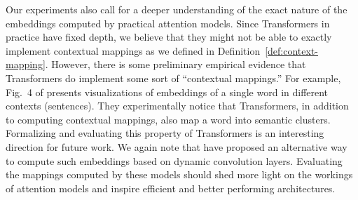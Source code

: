 
Our experiments also call for a deeper understanding of the exact nature of the embeddings computed by practical attention models.
Since Transformers in practice have fixed depth, we believe that they might not be able to exactly implement contextual mappings as we defined in Definition~\ref{def:context-mapping}. 
However, there is some preliminary empirical evidence that Transformers do implement some sort of ``contextual mappings.'' For example,
Fig.~4 of \citet{coenen2019visualizing} presents visualizations of
embeddings of a single word in different contexts (sentences). They experimentally notice that Transformers, in addition to computing contextual mappings, also map a word into semantic clusters. Formalizing and evaluating this property of Transformers is an interesting direction for future work. We again note that \citet{wu2019pay} have proposed an alternative way to compute such embeddings based on dynamic convolution layers. Evaluating the mappings computed by these models should shed more light on the workings of attention models and inspire efficient and better performing architectures.

